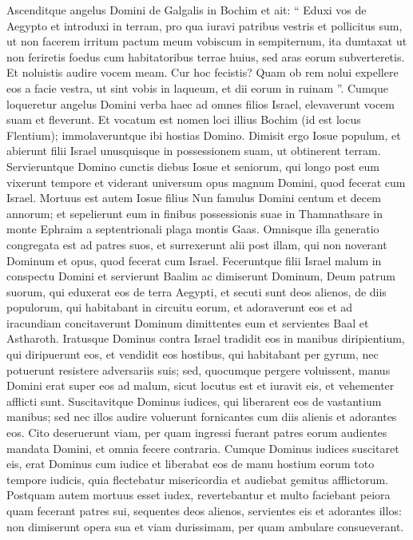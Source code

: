 \begin{biblechapter}
\begin{biblechapter}
\verse Ascenditque angelus Domini de Galgalis in Bochim et ait: “ Eduxi vos de Aegypto et introduxi in terram, pro qua iuravi patribus vestris et pollicitus sum, ut non facerem irritum pactum meum vobiscum in sempiternum, 
\verse ita dumtaxat ut non feriretis foedus cum habitatoribus terrae huius, sed aras eorum subverteretis. Et noluistis audire vocem meam. Cur hoc fecistis? 
\verse Quam ob rem nolui expellere eos a facie vestra, ut sint vobis in laqueum, et dii eorum in ruinam ”.
 \verse Cumque loqueretur angelus Domini verba haec ad omnes filios Israel, elevaverunt vocem suam et fleverunt. 
\verse Et vocatum est nomen loci illius Bochim (id est locus Flentium); immolaveruntque ibi hostias Domino.
 \verse Dimisit ergo Iosue populum, et abierunt filii Israel unusquisque in possessionem suam, ut obtinerent terram. 
\verse Servieruntque Domino cunctis diebus Iosue et seniorum, qui longo post eum vixerunt tempore et viderant universum opus magnum Domini, quod fecerat cum Israel. 
\verse Mortuus est autem Iosue filius Nun famulus Domini centum et decem annorum; 
\verse et sepelierunt eum in finibus possessionis suae in Thamnathsare in monte Ephraim a septentrionali plaga montis Gaas. 
\verse Omnisque illa generatio congregata est ad patres suos, et surrexerunt alii post illam, qui non noverant Dominum et opus, quod fecerat cum Israel.
 \verse Feceruntque filii Israel malum in conspectu Domini et servierunt Baalim 
 \verse ac dimiserunt Dominum, Deum patrum suorum, qui eduxerat eos de terra Aegypti, et secuti sunt deos alienos, de diis populorum, qui habitabant in circuitu eorum, et adoraverunt eos et ad iracundiam concitaverunt Dominum 
\verse dimittentes eum et servientes Baal et Astharoth. 
\verse Iratusque Dominus contra Israel tradidit eos in manibus diripientium, qui diripuerunt eos, et vendidit eos hostibus, qui habitabant per gyrum, nec potuerunt resistere adversariis suis; 
\verse sed, quocumque pergere voluissent, manus Domini erat super eos ad malum, sicut locutus est et iuravit eis, et vehementer afflicti sunt.
 \verse Suscitavitque Dominus iudices, qui liberarent eos de vastantium manibus; 
 \verse sed nec illos audire voluerunt fornicantes cum diis alienis et adorantes eos. Cito deseruerunt viam, per quam ingressi fuerant patres eorum audientes mandata Domini, et omnia fecere contraria. 
\verse Cumque Dominus iudices suscitaret eis, erat Dominus cum iudice et liberabat eos de manu hostium eorum toto tempore iudicis, quia flectebatur misericordia et audiebat gemitus afflictorum. 
\verse Postquam autem mortuus esset iudex, revertebantur et multo faciebant peiora quam fecerant patres sui, sequentes deos alienos, servientes eis et adorantes illos: non dimiserunt opera sua et viam durissimam, per quam ambulare consueverant.

\end{biblechapter}
\end{biblechapter}
